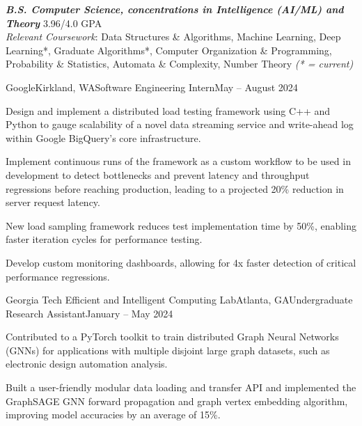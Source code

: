 \documentclass{article}
\begin{document}
\thispagestyle{empty}


\begin{flushleft}


{\textbf{\textit{B.S. Computer Science, concentrations in Intelligence (AI/ML) and Theory}} \hfill 3.96/4.0 GPA \\ \textit{Relevant Coursework}: Data Structures \& Algorithms, Machine Learning, Deep Learning*, Graduate Algorithms*, Computer Organization \& Programming, Probability \& Statistics, Automata \& Complexity, Number Theory \textit{(* = current)}}



    \begin{experience}{Google}{Kirkland, WA}{Software Engineering Intern}{May -- August 2024}
        \item Design and implement a distributed load testing framework using C++ and Python to gauge scalability of a novel data streaming service and write-ahead log within Google BigQuery's core infrastructure.
        \item Implement continuous runs of the framework as a custom workflow to be used in development to detect bottlenecks and prevent latency and throughput regressions before reaching production, leading to a projected 20\% reduction in server request latency.
        \item New load sampling framework reduces test implementation time by 50\%, enabling faster iteration cycles for performance testing.
        \item Develop custom monitoring dashboards, allowing for 4x faster detection of critical performance regressions.
    \end{experience}

    \begin{experience}{Georgia Tech Efficient and Intelligent Computing Lab}{Atlanta, GA}{Undergraduate Research Assistant}{January -- May 2024}
        \item Contributed to a PyTorch toolkit to train distributed Graph Neural Networks (GNNs) for applications with multiple disjoint large graph datasets, such as electronic design automation analysis.
        \item Built a user-friendly modular data loading and transfer API and implemented the GraphSAGE GNN forward propagation and graph vertex embedding algorithm, improving model accuracies by an average of 15\%.
    \end{experience}


\end{flushleft}
\end{document}
